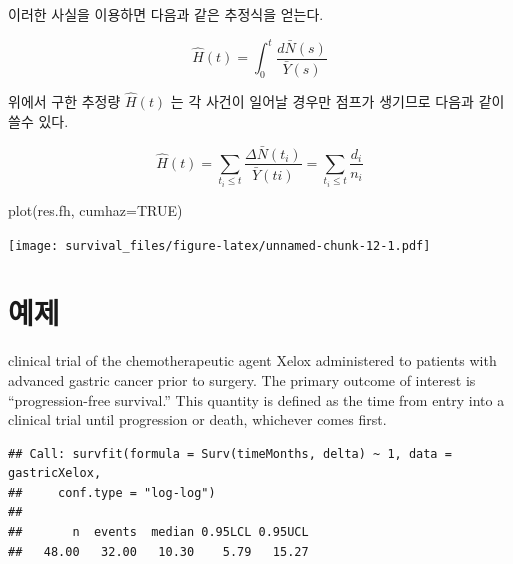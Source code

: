 \documentclass[
]{book}
\newenvironment{Shaded}{\begin{snugshade}}{\end{snugshade}}
\newcommand{\AttributeTok}[1]{\textcolor[rgb]{0.77,0.63,0.00}{#1}}
\newcommand{\CommentTok}[1]{\textcolor[rgb]{0.56,0.35,0.01}{\textit{#1}}}
\newcommand{\ConstantTok}[1]{\textcolor[rgb]{0.00,0.00,0.00}{#1}}
\newcommand{\DecValTok}[1]{\textcolor[rgb]{0.00,0.00,0.81}{#1}}
\newcommand{\FloatTok}[1]{\textcolor[rgb]{0.00,0.00,0.81}{#1}}
\newcommand{\FunctionTok}[1]{\textcolor[rgb]{0.00,0.00,0.00}{#1}}
\newcommand{\NormalTok}[1]{#1}
\newcommand{\OtherTok}[1]{\textcolor[rgb]{0.56,0.35,0.01}{#1}}
\newcommand{\SpecialCharTok}[1]{\textcolor[rgb]{0.00,0.00,0.00}{#1}}
\newcommand{\StringTok}[1]{\textcolor[rgb]{0.31,0.60,0.02}{#1}}
\theoremstyle{definition}
\theoremstyle{definition}
\theoremstyle{definition}
\theoremstyle{definition}
\theoremstyle{remark}
\begin{document}
이러한 사실을 이용하면 다음과 같은 추정식을 얻는다.

\[ \hat H(t) = \int_0^t \frac{d \bar N(s)} {\bar Y(s)} \]

위에서 구한 추정량 \(\hat H(t)\) 는 각 사건이 일어날 경우만 점프가 생기므로 다음과 같이 쓸수 있다.

\[ \hat H(t)  =\sum_{t_i \le t} \frac{\Delta \bar N(t_i)}{\bar Y(ti)}  =  \sum_{t_i \le t} \frac{d_i}{n_i}\]

\begin{Shaded}
\begin{Highlighting}[]
\FunctionTok{plot}\NormalTok{(res.fh, }\AttributeTok{cumhaz=}\ConstantTok{TRUE}\NormalTok{)}
\end{Highlighting}
\end{Shaded}

\texttt{[image: survival\_files/figure-latex/unnamed-chunk-12-1.pdf]}

\hypertarget{uxc608uxc81c}{%
\section{예제}\label{uxc608uxc81c}}

clinical trial of the chemotherapeutic agent Xelox administered to patients with advanced gastric cancer prior to surgery. The primary outcome of interest is ``progression-free survival.'' This quantity is defined as the time from entry into a clinical trial until progression or death, whichever comes first.

\begin{Shaded}
\end{Shaded}

\begin{verbatim}
## Call: survfit(formula = Surv(timeMonths, delta) ~ 1, data = gastricXelox, 
##     conf.type = "log-log")
## 
##       n  events  median 0.95LCL 0.95UCL 
##   48.00   32.00   10.30    5.79   15.27
\end{verbatim}
\end{document}
